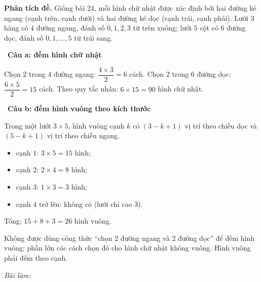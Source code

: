 \documentclass[11pt]{article}
\newif\ifsol \solfalse
\newcommand{\probsol}[1]{%
  \begin{lrbox}{\solmeasure}\begin{minipage}{\dimexpr\linewidth-24pt\relax}#1\end{minipage}\end{lrbox}%
  \ifsol
    \begin{solbox}#1\end{solbox}%
  \else
    \setlength{\solht}{\dimexpr\ht\solmeasure+\dp\solmeasure+0.85cm\relax}%
    \ifdim\solht<1.35cm\setlength{\solht}{1.35cm}\fi
    \ifdim\solht>\StudentMaxWork\setlength{\solht}{\StudentMaxWork}\fi
    \begin{tcolorbox}[colback=white,colframe=Line,boxrule=0.8pt,arc=5pt,
      left=8pt,right=8pt,top=4pt,bottom=4pt,height=\solht]{\footnotesize\color{Slate}\itshape\WorkWord}\end{tcolorbox}%
  \fi}
\newlength{\StudentMaxWork}\setlength{\StudentMaxWork}{7.5cm}
\newcommand{\step}[2]{\par\smallskip\noindent{\bfseries\color{tmBlue!85!black}\StepWord~#1.}\ {\bfseries #2}\par\nopagebreak}
\def\WorkWord{Bài làm:}
\def\StepWord{Bước}
\begin{document}
\probsol{
\textbf{Phân tích đề.} Giống bài 24, mỗi hình chữ nhật được xác định bởi hai đường kẻ ngang (cạnh trên, cạnh dưới) và hai đường kẻ dọc
(cạnh trái, cạnh phải). Lưới $3$ hàng có $4$ đường ngang, đánh số $0,1,2,3$ từ trên xuống; lưới $5$ cột có $6$ đường dọc, đánh số
$0,1,\dots,5$ từ trái sang.

\step{1}{Câu a: đếm hình chữ nhật}
Chọn $2$ trong $4$ đường ngang: $\dfrac{4\times3}{2}=6$ cách. Chọn $2$ trong $6$ đường dọc: $\dfrac{6\times5}{2}=15$ cách.
Theo quy tắc nhân: $6\times15=90$ hình chữ nhật.

\step{2}{Câu b: đếm hình vuông theo kích thước}
\begin{recallbox}Trong một lưới $3\times5$, hình vuông cạnh $k$ có $(3-k+1)$ vị trí theo chiều dọc và $(5-k+1)$ vị trí theo chiều ngang.\end{recallbox}
\begin{itemize}[leftmargin=1.2em,itemsep=1pt,topsep=2pt]
\item cạnh $1$: $3\times5=15$ hình;
\item cạnh $2$: $2\times4=8$ hình;
\item cạnh $3$: $1\times3=3$ hình;
\item cạnh $4$ trở lên: không có (lưới chỉ cao $3$).
\end{itemize}
Tổng: $15+8+3=26$ hình vuông.
\begin{warnbox}Không được dùng công thức ``chọn $2$ đường ngang và $2$ đường dọc'' để đếm hình vuông: phần lớn các cách chọn đó cho hình chữ
nhật không vuông. Hình vuông phải đếm theo cạnh.\end{warnbox}

}
\end{document}
